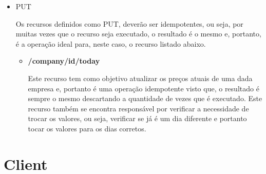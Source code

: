 \documentclass[a4paper,12pt]{article}
\begin{document}
\begin{itemize}
\begin{itemize}
    
  \end{itemize}
\item PUT
  \par Os recursos definidos como PUT, deverão ser idempotentes, ou seja, por muitas vezes que o recurso seja executado, o resultado é o mesmo e, portanto, é a operação ideal para, neste caso, o recurso listado abaixo.
  \begin{itemize}
    \item \textbf{/company/{id}/today}

    \par Este recurso tem como objetivo atualizar os preços atuais de uma dada empresa e, portanto é uma operação idempotente visto que, o resultado é sempre o mesmo descartando a quantidade de vezes que é executado. Este recurso também se encontra responsável por verificar a necessidade de trocar os valores, ou seja, verificar se já é um dia diferente e portanto tocar os valores para os dias corretos.
  \end{itemize}
\end{itemize}

\section{Client}
\end{document}
